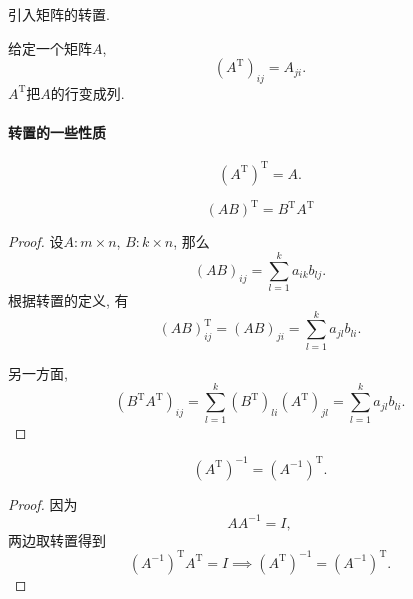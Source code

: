 

引入矩阵的转置.
\begin{definition}
    给定一个矩阵$A$,
    \begin{equation}
      \left( A^{\mathrm{T}} \right) _{ij}=A_{ji}.
    \end{equation}
    $A^{\mathrm{T}}$把$A$的行变成列.
\end{definition}

\paragraph{转置的一些性质}
\begin{equation}
  \left( A^{\mathrm{T}} \right) ^{\mathrm{T}} = A.
\end{equation}

\begin{equation}
  \left( AB \right) ^{\mathrm{T}} = B^{\mathrm{T}}A^{\mathrm{T}}
\end{equation}
\begin{proof}
    设$A\colon m \times n$, $B\colon k \times n$, 那么
    \begin{equation}
      \left( AB \right) _{ij} = \sum_{l=1}^{k} a_{ik}b_{lj}.
    \end{equation}
    根据转置的定义, 有
    \begin{equation}
      \left( AB \right) ^{\mathrm{T}}_{ij} = \left( AB \right) _{ji} = \sum_{l=1}^{k} a_{jl} b_{li}.
    \end{equation}

    另一方面,
    \begin{equation}
      \left( B^{\mathrm{T}}A^{\mathrm{T}} \right) _{ij} = \sum_{l=1}^{k} \left( B^{\mathrm{T}} \right) _{li} \left( A^{\mathrm{T}} \right) _{jl} = \sum_{l=1}^{k} a_{jl} b_{li}.
    \end{equation}
\end{proof}

\begin{equation}
  \left( A^{\mathrm{T}} \right) ^{-1} = \left( A^{-1} \right) ^{\mathrm{T}}.
\end{equation}
\begin{proof}
    因为
    \begin{equation}
      A A^{-1} = I,
    \end{equation}
    两边取转置得到
    \begin{equation}
      \left( A^{-1} \right) ^{\mathrm{T}} A^{\mathrm{T}} = I \implies \left( A^{\mathrm{T}} \right) ^{-1} = \left( A^{-1} \right) ^{\mathrm{T}}.
    \end{equation}
\end{proof}

